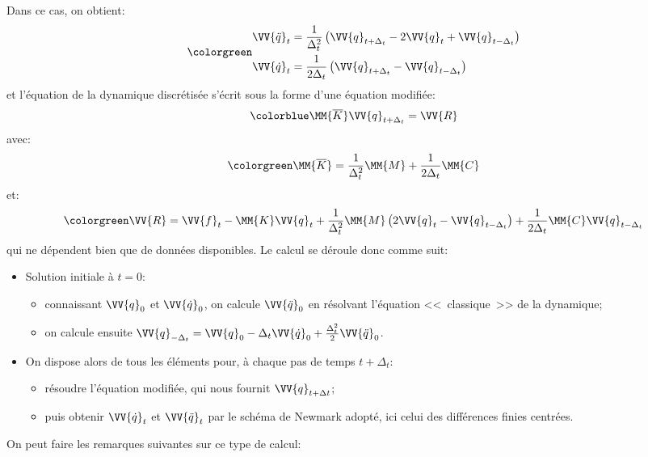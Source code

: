Dans ce cas, on obtient:
\begin{equation}\colorgreen
\begin{aligned}
&\VV{\ddot q}_t = \frac1{\Delta_t^2} \left( \VV{q}_{t+\Delta_t} - 2\VV{q}_t + \VV{q}_{t-\Delta_t}\right)\\
&\VV{\dot q}_t =  \frac1{2\Delta_t}\left( \VV{q}_{t+\Delta_t} - \VV{q}_{t-\Delta_t}\right)
\end{aligned}
\end{equation}
et l'équation de la dynamique discrétisée s'écrit sous la forme d'une équation modifiée:
\begin{equation}\colorblue
\MM{\overline{K}} \VV{q}_{t+\Delta_t} = \VV{R}
\end{equation}
avec:
\begin{equation}\colorgreen
\MM{\overline{K}} = \frac1{\Delta_t^2}\MM{M}+\frac1{2\Delta_t}\MM{C}
\end{equation}
et:
\begin{equation}\colorgreen
\VV{R} = \VV{f}_t -\MM{K}\VV{q}_t + \frac1{\Delta_t^2}\MM{M}\left( 2\VV{q}_t -\VV{q}_{t-\Delta_t}\right)
+\frac1{2\Delta_t}\MM{C}\VV{q}_{t-\Delta_t}
\end{equation}
qui ne dépendent bien que de données disponibles.
\bigskip
Le calcul se déroule donc comme suit:
\begin{itemize}
   \item Solution initiale à $t=0$:
	\begin{itemize}
	\item connaissant $\VV{q}_0$ et $\VV{\dot q}_0$, on calcule $\VV{\ddot q}_0$ en résolvant
	l'équation <<~classique~>> de la dynamique;
	\item on calcule ensuite $\VV{q}_{-\Delta_t} = \VV{q}_0 -\Delta_t \VV{\dot q}_0 + \frac{\Delta_t^2}2
	\VV{\ddot q}_0$.
	\end{itemize}
   \item On dispose alors de tous les éléments pour, à chaque pas de temps
	$t+\Delta_t$:
	\begin{itemize}
	\item résoudre l'équation modifiée, qui nous fournit $\VV{q}_{t+\Delta t}$;
	\item puis obtenir $\VV{\dot q}_t$ et $\VV{\ddot q}_t$ par le schéma de Newmark adopté,
	ici celui des différences finies centrées.
	\end{itemize}
\end{itemize}
\bigskip
On peut faire les remarques suivantes sur ce type de calcul:
